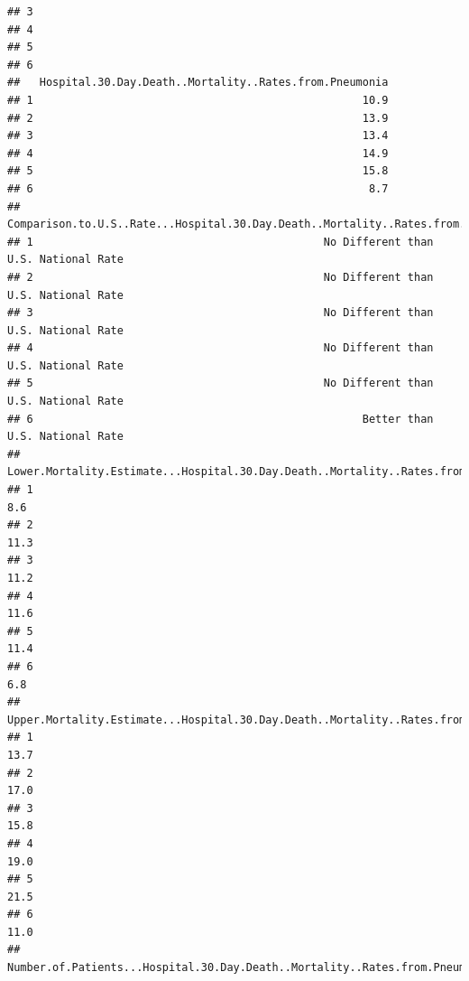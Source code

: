 \documentclass[
]{article}
\begin{document}
\begin{verbatim}
## 3                                                                      
## 4                                                                      
## 5                                                                      
## 6                                                                      
##   Hospital.30.Day.Death..Mortality..Rates.from.Pneumonia
## 1                                                   10.9
## 2                                                   13.9
## 3                                                   13.4
## 4                                                   14.9
## 5                                                   15.8
## 6                                                    8.7
##   Comparison.to.U.S..Rate...Hospital.30.Day.Death..Mortality..Rates.from.Pneumonia
## 1                                             No Different than U.S. National Rate
## 2                                             No Different than U.S. National Rate
## 3                                             No Different than U.S. National Rate
## 4                                             No Different than U.S. National Rate
## 5                                             No Different than U.S. National Rate
## 6                                                   Better than U.S. National Rate
##   Lower.Mortality.Estimate...Hospital.30.Day.Death..Mortality..Rates.from.Pneumonia
## 1                                                                               8.6
## 2                                                                              11.3
## 3                                                                              11.2
## 4                                                                              11.6
## 5                                                                              11.4
## 6                                                                               6.8
##   Upper.Mortality.Estimate...Hospital.30.Day.Death..Mortality..Rates.from.Pneumonia
## 1                                                                              13.7
## 2                                                                              17.0
## 3                                                                              15.8
## 4                                                                              19.0
## 5                                                                              21.5
## 6                                                                              11.0
##   Number.of.Patients...Hospital.30.Day.Death..Mortality..Rates.from.Pneumonia

\end{verbatim}
\end{document}
